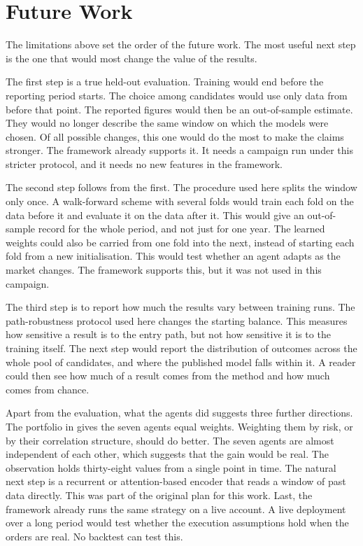 \section{Future Work}
\label{Section:FutureWork}

The limitations above set the order of the future work. The most useful next step is the one that would most change the value of the results.

The first step is a true held-out evaluation. Training would end before the reporting period starts. The choice among candidates would use only data from before that point. The reported figures would then be an out-of-sample estimate. They would no longer describe the same window on which the models were chosen. Of all possible changes, this one would do the most to make the claims stronger. The framework already supports it. It needs a campaign run under this stricter protocol, and it needs no new features in the framework.

The second step follows from the first. The procedure used here splits the window only once. A walk-forward scheme with several folds would train each fold on the data before it and evaluate it on the data after it. This would give an out-of-sample record for the whole period, and not just for one year. The learned weights could also be carried from one fold into the next, instead of starting each fold from a new initialisation. This would test whether an agent adapts as the market changes. The framework supports this, but it was not used in this campaign.

The third step is to report how much the results vary between training runs. The path-robustness protocol used here changes the starting balance. This measures how sensitive a result is to the entry path, but not how sensitive it is to the training itself. The next step would report the distribution of outcomes across the whole pool of candidates, and where the published model falls within it. A reader could then see how much of a result comes from the method and how much comes from chance.

Apart from the evaluation, what the agents did suggests three further directions. The portfolio in  gives the seven agents equal weights. Weighting them by risk, or by their correlation structure, should do better. The seven agents are almost independent of each other, which suggests that the gain would be real. The observation holds thirty-eight values from a single point in time. The natural next step is a recurrent or attention-based encoder that reads a window of past data directly. This was part of the original plan for this work. Last, the framework already runs the same strategy on a live account. A live deployment over a long period would test whether the execution assumptions hold when the orders are real. No backtest can test this.

